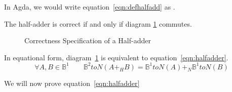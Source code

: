 \documentclass[14pt]{extarticle}  %
\begin{document}
In Agda, we would write equation~\ref{eqn:defhalfadd} as .

The half-adder is correct if and only if diagram \ref{fig:halfadder} commutes.

\begin{figure}[h]
\centering
\caption{Correctness Specification of a Half-adder}
\label{fig:halfadder}
\end{figure}

In equational form, diagram~\ref{fig:halfadder} is equivalent to equation~\ref{eqn:halfadder}.
\begin{equation}\label{eqn:halfadder}
\forall A,B \in \mathbb{B}^{1} \qquad \mathbb{B}^{2}toN(A +_{H} B) = \mathbb{B}^{1}toN(A) +_{N} \mathbb{B}^{1}toN(B)
\end{equation}

We will now prove equation~\ref{eqn:halfadder}
\end{document}
